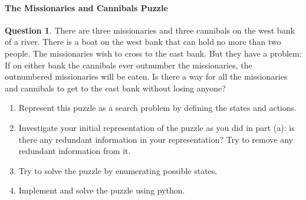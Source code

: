 \documentclass[11pt,a4paper]{article}
\theoremstyle{definition}%
\newtheorem{Q}{Question}[] %
\begin{document}
\paragraph{ The Missionaries and Cannibals Puzzle}
\begin{Q}
    There are three missionaries and three cannibals on the west bank of a river. There is a
boat on the west bank that can hold no more than two people. The missionaries wish to
cross to the east bank. But they have a problem: If on either bank the cannibals ever
outnumber the missionaries, the outnumbered missionaries will be eaten. Is there a way for
all the missionaries and cannibals to get to the east bank without losing anyone?

\begin{enumerate}
    \item Represent this puzzle as a search problem by defining the states and actions.
    \item Investigate your initial representation of the puzzle as you did in part (a): is there
any redundant information in your representation? Try to remove any redundant
information from it.
    \item Try to solve the puzzle by enumerating possible states.
    \item Implement and solve the puzzle using python. 
\end{enumerate}


\end{Q}
\end{document}

